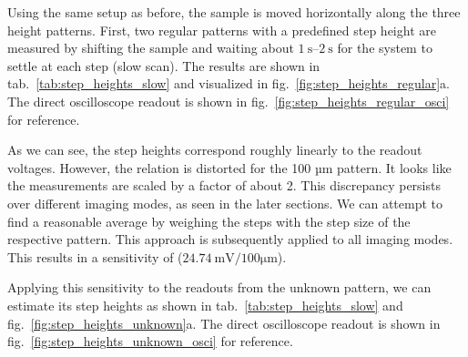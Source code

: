 \documentclass[a4paper,twoside,11pt,DIV=13,BCOR=5mm,numbers=noenddot]{scrbook}
\begin{document}
Using the same setup as before, the sample is moved horizontally along the three height patterns. First, two regular patterns with a predefined step height are measured by
shifting the sample and waiting about $\qtyrange{1}{2}{\s}$ for the system to settle at each step (slow scan).
The results are shown in tab.~\ref{tab:step_heights_slow} and visualized in fig.~\ref{fig:step_heights_regular}a. The direct oscilloscope readout is shown in fig.~\ref{fig:step_heights_regular_osci} for reference.



As we can see, the step heights correspond roughly linearly to the readout voltages. However, the relation is distorted for the 100 µm pattern. It looks like the measurements are scaled by a factor of about 2.
This discrepancy persists over different imaging modes, as seen in the later sections.
We can attempt to find a reasonable average by weighing the steps with the step size of the respective pattern. This approach is subsequently applied to all imaging modes.
This results in a sensitivity of ($\qty{24.74}{\milli\V\per100\micro\m}$).

Applying this sensitivity to the readouts from the unknown pattern, we can estimate its step heights as shown in tab.~\ref{tab:step_heights_slow} and fig.~\ref{fig:step_heights_unknown}a.
The direct oscilloscope readout is shown in fig.~\ref{fig:step_heights_unknown_osci} for reference.
\end{document}
